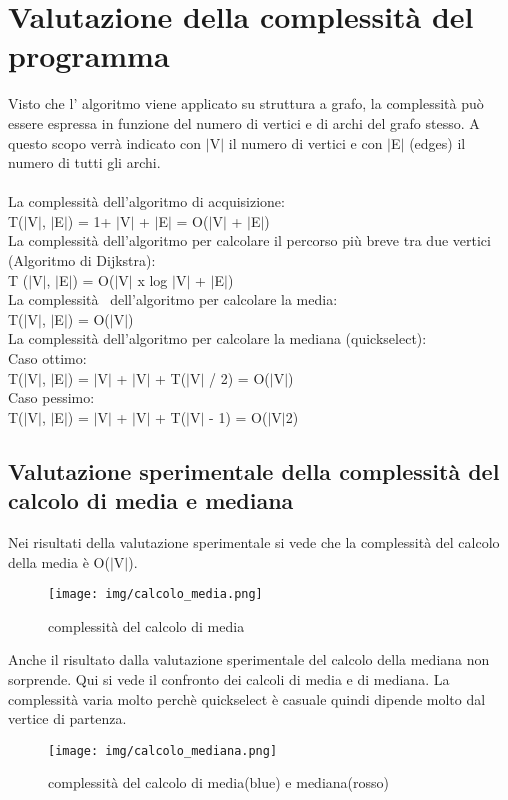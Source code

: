 \documentclass[11pt, a4paper, titlepage, block]{article}
\begin{document}
	\newpage
\section{Valutazione della complessit\`{a} del programma}
	Visto che l' algoritmo viene applicato su struttura a grafo, la complessit\`{a} pu\`{o} essere espressa in 
	funzione del numero di vertici e di archi del grafo stesso. A questo scopo verr\`{a} indicato con $|$V$|$ il 
	numero di vertici e con $|$E$|$ (edges) il numero di tutti gli archi.\\
	\\
	La complessit\`{a} dell'algoritmo di acquisizione:\\
	\indent T($|$V$|$, $|$E$|$) = 1+ $|$V$|$ + $|$E$|$ = O($|$V$|$ + $|$E$|$)\\
	La complessit\`{a} dell'algoritmo per calcolare il percorso pi\`{u} breve tra due vertici (Algoritmo di Dijkstra):\\
	\indent T ($|$V$|$, $|$E$|$) = O($|$V$|$ x log $|$V$|$ + $|$E$|$)\\
	La complessit\`{a}  dell'algoritmo per calcolare la media:\\
	\indent T($|$V$|$, $|$E$|$) = O($|$V$|$)\\
	La complessit\`{a} dell'algoritmo per calcolare la mediana (quickselect):\\
	\indent Caso ottimo:\\
	\indent \indent T($|$V$|$, $|$E$|$) = $|$V$|$ + $|$V$|$ + T($|$V$|$ / 2) = O($|$V$|$)\\
	\indent Caso pessimo:\\
	\indent \indent T($|$V$|$, $|$E$|$) = $|$V$|$ + $|$V$|$ + T($|$V$|$ - 1) = O($|$V$|$2)\\
	\newpage
\subsection{Valutazione sperimentale della complessit\`{a} del calcolo di media e mediana}
	Nei risultati della valutazione sperimentale si vede che la complessit\`{a} del calcolo della media \`{e} O($|$V$|$).
	\begin{figure}[htp]
	\centering
	\texttt{[image: img/calcolo\_media.png]}
	\caption{complessit\`{a} del calcolo di media}
	\end{figure}
	\newpage
	Anche il risultato dalla valutazione sperimentale del calcolo della mediana non sorprende. Qui si vede il confronto dei calcoli di media e di mediana. 
	La complessit\`{a} varia molto perch\`{e} quickselect \`{e} casuale quindi dipende molto dal vertice di partenza.
	\begin{figure}[htp]
	\centering
	\texttt{[image: img/calcolo\_mediana.png]}
	\caption{complessit\`{a} del calcolo di media(blue) e mediana(rosso)}
	\end{figure}
\end{document}
